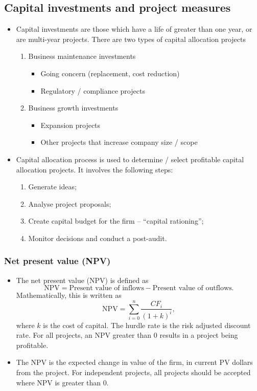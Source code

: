 \documentclass[../notes_compiled.tex]{subfiles}
\begin{document}
\subsection{Capital investments and project measures}
\begin{itemize}
\item Capital investments are those which have a life of greater than one year, or are multi-year projects. There are two types of capital allocation projects
\begin{enumerate}
\item Business maintenance investments
\begin{itemize}
\item Going concern (replacement, cost reduction)
\item Regulatory / compliance projects
\end{itemize}
\item Business growth investments
\begin{itemize}
\item Expansion projects
\item Other projects that increase company size / scope
\end{itemize}
\end{enumerate}

\item Capital allocation process is used to determine / select profitable capital allocation projects. It involves the following steps:
\begin{enumerate}
\item Generate ideas;
\item Analyse project proposals;
\item Create capital budget for the firm -- ``capital rationing'';
\item Monitor decisions and conduct a post-audit.
\end{enumerate}
\end{itemize}

\subsubsection{Net present value (NPV)}
\begin{itemize}
\item The net present value (NPV) is defined as
\begin{equation}
\mathrm{NPV} = \text{Present value of inflows} - \text{Present value of outflows}.
\end{equation}
Mathematically, this is written as
\begin{equation}
\mathrm{NPV} = \sum_{i=0}^{n} \frac{CF_{i}}{(1+k)^{i}},
\end{equation}
where $k$ is the cost of capital. The hurdle rate is the risk adjusted discount rate. For all projects, an NPV greater than 0 results in a project being profitable.
\item[] The NPV is the expected change in value of the firm, in current PV dollars from the project. For independent projects, all projects should be accepted where NPV is greater than 0.
\end{itemize}
\end{document}
